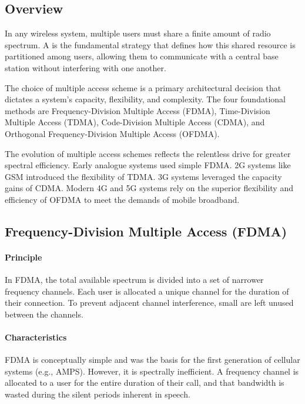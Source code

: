 \subsection{Overview}

In any wireless system, multiple users must share a finite amount of radio spectrum. A  is the fundamental strategy that defines how this shared resource is partitioned among users, allowing them to communicate with a central base station without interfering with one another.

The choice of multiple access scheme is a primary architectural decision that dictates a system's capacity, flexibility, and complexity. The four foundational methods are Frequency-Division Multiple Access (FDMA), Time-Division Multiple Access (TDMA), Code-Division Multiple Access (CDMA), and Orthogonal Frequency-Division Multiple Access (OFDMA).

\begin{keyconcept}
    The evolution of multiple access schemes reflects the relentless drive for greater spectral efficiency. Early analogue systems used simple FDMA. 2G systems like GSM introduced the flexibility of TDMA. 3G systems leveraged the capacity gains of CDMA. Modern 4G and 5G systems rely on the superior flexibility and efficiency of OFDMA to meet the demands of mobile broadband.
\end{keyconcept}

\subsection{Frequency-Division Multiple Access (FDMA)}

\paragraph{Principle}
In FDMA, the total available spectrum is divided into a set of narrower frequency channels. Each user is allocated a unique channel for the duration of their connection. To prevent adjacent channel interference, small  are left unused between the channels.

\paragraph{Characteristics}
FDMA is conceptually simple and was the basis for the first generation of cellular systems (e.g., AMPS). However, it is spectrally inefficient. A frequency channel is allocated to a user for the entire duration of their call, and that bandwidth is wasted during the silent periods inherent in speech.

